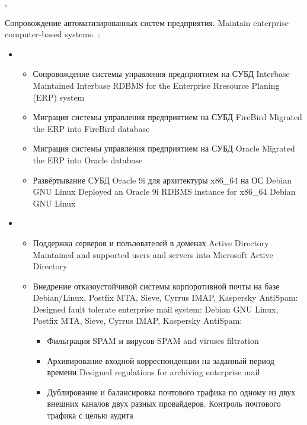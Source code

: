 \documentclass[11pt,a4paper,sans, russian]{moderncv}        %
\begin{document}
{\protect{}}
{\cityperm, \country}
{}
{
{Сопровождение автоматизированных систем предприятия.}
{Maintain enterprise computer-based systems.}\newline{}
\achievements:
\begin{itemize}
\item {}
	\begin{itemize}
	\item {}
		{Сопровождение системы управления предприятием на СУБД Interbase}
		{Maintained Interbase RDBMS for the Enterprise Rresource Planing (ERP) system}
	\item {}
		{Миграция системы управления предприятием на СУБД FireBird}
		{Migrated the ERP into FireBird database}
	\item {}
		{Миграция системы управления предприятием на СУБД Oracle}
		{Migrated the ERP into Oracle database}
	\item {}
		{Развёртывание СУБД Oracle 9i для архитектуры x86\_64 на ОС Debian GNU Linux}
		{Deployed an Oracle 9i RDBMS instance for x86\_64 Debian GNU Linux}
	\end{itemize}
\item {}
	\begin{itemize}
		\item {}
			{Поддержка серверов и пользователей в доменах Active Directory}
			{Maintained and supported users and servers into Microsoft Active Directory}
		\item {}
			{Внедрение отказоустойчивой системы корпоротивной почты на базе Debian/Linux, Postfix MTA, Sieve, Cyrrus IMAP, Kaspersky AntiSpam:}
			{Designed fault tolerate enterprise mail system: Debian GNU Linux, Postfix MTA, Sieve, Cyrrus IMAP, Kaspersky AntiSpam: }
			\begin{itemize}
			\item {}
				{Фильтрация SPAM и вирусов}
				{SPAM and viruses filtration}
			\item {}
				{Архивирование входной корреспонденции на заданный период времени}
				{Designed regulations for archiving enterprise mail}
			\item {}
				{Дублирование и балансировка почтового трафика по одному из двух внешних каналов двух разных провайдеров. Контроль почтового трафика с целью аудита}

\end{itemize}
\end{itemize}
\end{itemize}}
\end{document}
